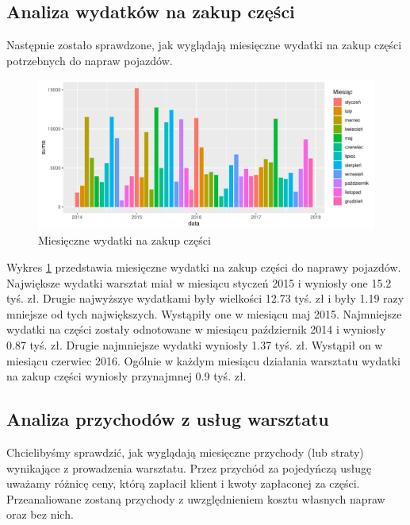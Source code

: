 \documentclass{article}\usepackage[]{graphicx}\usepackage[]{xcolor}
\makeatletter
\def\maxwidth{ %
  \ifdim\Gin@nat@width>\linewidth
    \linewidth
  \else
    \Gin@nat@width
  \fi
}
\newenvironment{knitrout}{}{} %
\makeatother
\begin{document}
\subsection{Analiza wydatków na zakup części}

Następnie zostało sprawdzone, jak wyglądają miesięczne wydatki na zakup części potrzebnych do napraw pojazdów.

\begin{knitrout}
\color{fgcolor}\begin{figure}[H]

{\centering \includegraphics[width=\maxwidth]{figure/fig_zakup_czesci-1} 

}

\caption[Miesięczne wydatki na zakup części]{Miesięczne wydatki na zakup części}\label{fig:fig_zakup_czesci}
\end{figure}

\end{knitrout}

Wykres \ref{fig:fig_zakup_czesci} przedstawia miesięczne wydatki na zakup części do naprawy pojazdów.
Największe wydatki warsztat miał w miesiącu styczeń 2015 i wyniosły one 15.2 tyś. zł. 
Drugie najwyższye wydatkami były wielkości 12.73 tyś. zł i były 1.19 razy mniejsze od tych największych. Wystąpiły one w miesiącu maj 2015.
Najmniejsze wydatki na części zostały odnotowane w miesiącu październik 2014 i wyniosły 0.87 tyś. zł. 
Drugie najmniejsze wydatki wyniosły 1.37 tyś. zł. Wystąpił on w miesiącu czerwiec 2016.
Ogólnie w każdym miesiącu działania warsztatu wydatki na zakup części wyniosły przynajmnej 0.9 tyś. zł.

\subsection{Analiza przychodów z usług warsztatu}

Chcielibyśmy sprawdzić, jak wyglądają miesięczne przychody (lub straty) wynikające z prowadzenia warsztatu. Przez przychód za pojedyńczą usługę uważamy różnicę ceny, którą zapłacił klient i kwoty zapłaconej za części. Przeanaliowane zostaną przychody z uwzględnieniem kosztu własnych napraw oraz bez nich.
\end{document}
